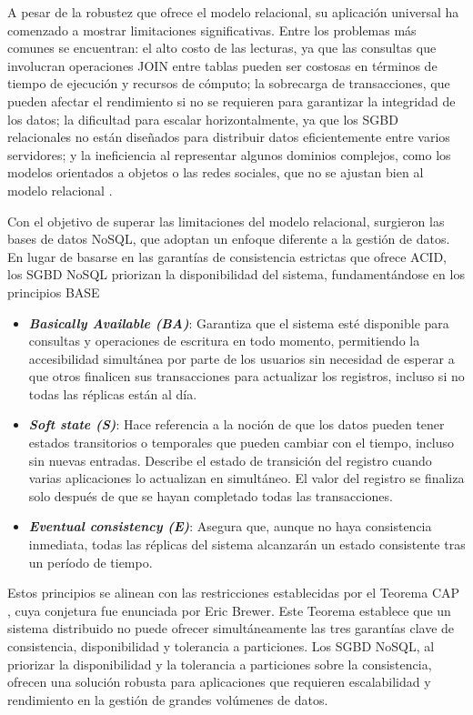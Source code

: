 A pesar de la robustez que ofrece el modelo relacional, su aplicación universal 
ha comenzado a mostrar limitaciones significativas. Entre los problemas más comunes 
se encuentran: el alto costo de las lecturas, ya que las consultas que involucran 
operaciones JOIN entre tablas pueden ser costosas en términos de tiempo 
de ejecución y recursos de cómputo; la sobrecarga de transacciones, que pueden afectar 
el rendimiento si no se requieren para garantizar la integridad de los datos; 
la dificultad para escalar horizontalmente, ya que los SGBD relacionales no están 
diseñados para distribuir datos eficientemente entre varios servidores; y la ineficiencia 
al representar algunos dominios complejos, como los modelos orientados a objetos o 
las redes sociales, que no se ajustan bien al modelo relacional \cite{Camacho}.

Con el objetivo de superar las limitaciones del modelo relacional, surgieron 
las bases de datos NoSQL, que adoptan un enfoque diferente a la gestión de datos. 
En lugar de basarse en las garantías de consistencia estrictas que ofrece ACID, 
los SGBD NoSQL priorizan la disponibilidad del sistema, fundamentándose en los 
principios BASE \cite{AWS}

\begin{itemize}
    \item \textbf{\textit{Basically Available (BA)}}: Garantiza que el sistema esté disponible 
    para consultas y operaciones de escritura en todo momento, permitiendo la accesibilidad 
    simultánea por parte de los usuarios sin necesidad de esperar a que otros finalicen 
    sus transacciones para actualizar los registros, incluso si no todas las réplicas 
    están al día.
    \item \textbf{\textit{Soft state (S)}}: Hace referencia a la noción de que los datos pueden 
    tener estados transitorios o temporales que pueden cambiar con el tiempo, incluso 
    sin nuevas entradas. Describe el estado de transición del registro cuando varias 
    aplicaciones lo actualizan en simultáneo. El valor del registro se finaliza solo 
    después de que se hayan completado todas las transacciones. 
    \item \textbf{\textit{Eventual consistency (E)}}: Asegura que, aunque no haya consistencia 
    inmediata, todas las réplicas del sistema alcanzarán un estado consistente tras un período de tiempo.
\end{itemize}

Estos principios se alinean con las restricciones establecidas por el Teorema CAP \cite{CAP}, 
cuya conjetura fue enunciada por Eric Brewer. Este Teorema establece que un sistema distribuido 
no puede ofrecer simultáneamente las tres garantías clave de consistencia, disponibilidad 
y tolerancia a particiones. Los SGBD NoSQL, al priorizar la disponibilidad y la tolerancia 
a particiones sobre la consistencia, ofrecen una solución robusta para aplicaciones que requieren 
escalabilidad y rendimiento en la gestión de grandes volúmenes de datos.

